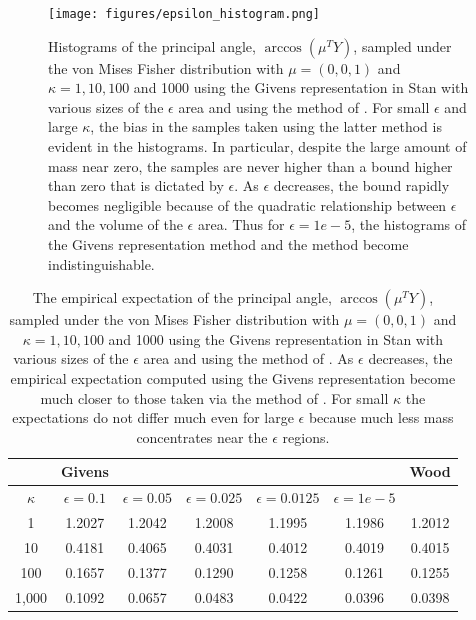 \documentclass[ba]{imsart}
\numberwithin{equation}{section}
\theoremstyle{plain}
\begin{document}
\begin{figure}[h]
\centering
\vspace{.1in}
\texttt{[image: figures/epsilon\_histogram.png]}
\vspace{.05in}
\caption{Histograms of the principal angle, $\arccos (\mu^T Y)$, sampled under the von Mises Fisher distribution with $\mu = (0,0,1)$ and $\kappa = 1, 10, 100$ and 1000 using the Givens representation in Stan with various sizes of the $\epsilon$ area and using the method of \citet{wood1994simulation}. For small $\epsilon$ and large $\kappa$, the bias in the samples taken using the latter method is evident in the histograms. In particular, despite the large amount of mass near zero, the samples are never higher than a bound higher than zero that is dictated by $\epsilon$. As $\epsilon$ decreases, the bound rapidly becomes negligible because of the quadratic relationship between $\epsilon$ and the volume of the $\epsilon$ area. Thus for $\epsilon = 1e-5$, the histograms of the Givens representation method and the \citet{wood1994simulation} method become indistinguishable.}
\label{fig:epsilon_histogram}
\end{figure}

\begin{table}
\begin{tabular}{|c||ccccc|c|}
\hline
 &   Givens &  &  &  & & Wood\\
\hline
$\kappa$ & $\epsilon = 0.1$ & $\epsilon = 0.05$ & $\epsilon = 0.025$ & $\epsilon = 0.0125$ & $\epsilon = 1e-5$ & \\
\hline
\hline
1 & 1.2027 & 1.2042 & 1.2008 & 1.1995 & 1.1986 & 1.2012\\
10 & 0.4181 & 0.4065 & 0.4031 & 0.4012 & 0.4019 & 0.4015\\
100 & 0.1657 & 0.1377 & 0.1290 & 0.1258 & 0.1261 & 0.1255 \\
1,000 & 0.1092 & 0.0657 & 0.0483 & 0.0422 & 0.0396 & 0.0398\\
\hline
\end{tabular}
\caption{The empirical expectation of the principal angle, $\arccos (\mu^T Y)$, sampled under the von Mises Fisher distribution with $\mu = (0,0,1)$ and $\kappa = 1, 10, 100$ and 1000 using the Givens representation in Stan with various sizes of the $\epsilon$ area and using the method of \citet{wood1994simulation}. As $\epsilon$ decreases, the empirical expectation computed using the Givens representation become much closer to those taken via the method of \citet{wood1994simulation}. For small $\kappa$ the expectations do not differ much even for large $\epsilon$ because much less mass concentrates near the $\epsilon$ regions.}
\label{tab:vmf_epsilon_region_expectations}
\end{table}
\end{document}

